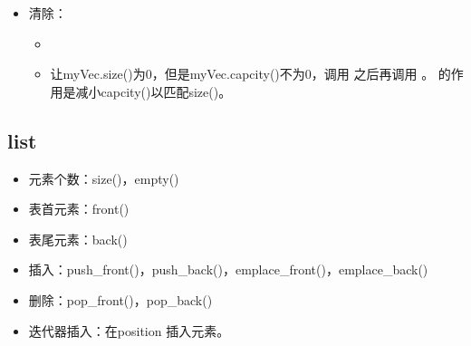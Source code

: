 \documentclass[letterpaper,10pt,english]{sphinxmanual}
\begin{document}
\begin{itemize}
\item {} 
清除：
\begin{itemize}
\item {} 

\item {} 
 让myVec.size()为0，但是myVec.capcity()不为0，调用  之后再调用  。  的作用是减小capcity()以匹配size()。

\end{itemize}

\end{itemize}


\subsection{list}
\label{\detokenize{cpp/19_stl:list}}
%
\begin{sphinxVerbatim}[commandchars=\\\{\}]
\end{sphinxVerbatim}

\begin{itemize}
\item {} 
元素个数：size()，empty()

\item {} 
表首元素：front()

\item {} 
表尾元素：back()

\item {} 
插入：push\_front()，push\_back()，emplace\_front()，emplace\_back()

\item {} 
删除：pop\_front()，pop\_back()

\item {} 
迭代器插入：在position  插入元素。

%
\begin{sphinxVerbatim}[commandchars=\\\{\}]
      
\end{sphinxVerbatim}

\end{itemize}
\end{document}
